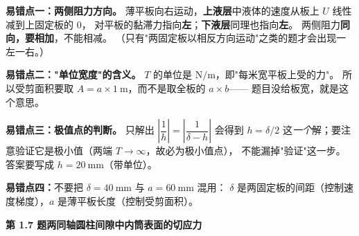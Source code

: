 \begin{yicuo}
\textbf{易错点一：两侧阻力方向。}
薄平板向右运动，\textbf{上液层}中液体的速度从板上 $U$ 线性减到上固定板的 $0$，
对平板的黏滞力指向\textbf{左}；\textbf{下液层}同理也指向\textbf{左}。
两侧阻力\textbf{同向，要相加}，不能相减。
（只有"两固定板以相反方向运动"之类的题才会出现一左一右。）

\textbf{易错点二："单位宽度"的含义。}
$T$ 的单位是 $\mathrm{N/m}$，即"每米宽平板上受的力"。
所以受剪面积要取 $A=a\times1\ \mathrm{m}$，而不是取全板的 $a\times b$——
题目没给板宽，就是这个意思。

\textbf{易错点三：极值点的判断。}
只解出 $\left|\dfrac{1}{h}\right|=\left|\dfrac{1}{\delta-h}\right|$ 会得到 $h=\delta/2$
这\emph{一个}解；要注意验证它是极小值（两端 $T\to\infty$，故必为极小值点），
不能漏掉"验证"这一步。答案要写成 $h=20\ \mathrm{mm}$（带单位）。

\textbf{易错点四：}不要把 $\delta=40\ \mathrm{mm}$ 与 $a=60\ \mathrm{mm}$ 混用：
$\delta$ 是两固定板的间距（控制速度梯度），$a$ 是薄平板长度（控制受剪面积）。
\end{yicuo}

\noindent\textbf{第 1.7 题\quad 两同轴圆柱间隙中内筒表面的切应力}


